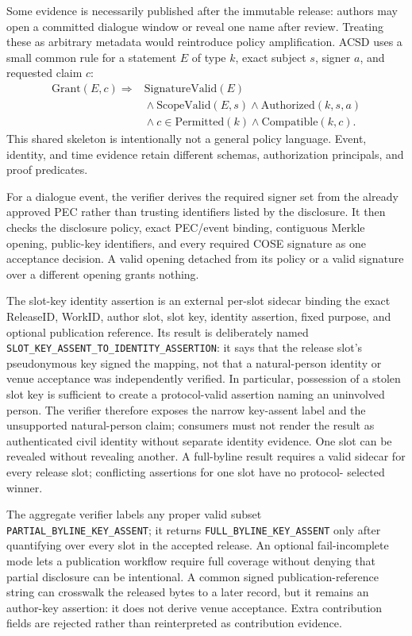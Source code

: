 \documentclass[conference,compsoc]{IEEEtran}
\newcommand{\releaseid}{\textsf{ReleaseID}}
\begin{document}
Some evidence is necessarily published after the immutable release: authors
may open a committed dialogue window or reveal one name after review. Treating
these as arbitrary metadata would reintroduce policy amplification. ACSD uses
a small common rule for a statement $E$ of type $k$, exact subject $s$, signer
$a$, and requested claim $c$:
\[
\begin{aligned}
 \mathrm{Grant}(E,c) \Rightarrow{}& \mathrm{SignatureValid}(E) \\
 &{}\land \mathrm{ScopeValid}(E,s)
 \land \mathrm{Authorized}(k,s,a) \\
 &{}\land c\in\mathrm{Permitted}(k)
 \land \mathrm{Compatible}(k,c).
\end{aligned}
\]
This shared skeleton is intentionally not a general policy language. Event,
identity, and time evidence retain different schemas, authorization principals,
and proof predicates.

For a dialogue event, the verifier derives the required signer set from the
already approved PEC rather than trusting identifiers listed by the disclosure.
It then checks the disclosure policy, exact PEC/event binding, contiguous
Merkle opening, public-key identifiers, and every required COSE signature as
one acceptance decision. A valid opening detached from its policy or a valid
signature over a different opening grants nothing.

The slot-key identity assertion is an external per-slot sidecar binding the exact
\releaseid, WorkID, author slot, slot key, identity assertion, fixed purpose,
and optional publication reference. Its result is deliberately named
\texttt{SLOT\_KEY\_ASSENT\_TO\_IDENTITY\_ASSERTION}: it says that the release
slot's pseudonymous key signed the mapping, not that a natural-person identity
or venue acceptance was independently verified. In particular, possession of
a stolen slot key is sufficient to create a protocol-valid assertion naming an
uninvolved person. The verifier therefore exposes the narrow key-assent label
and the unsupported natural-person claim; consumers must not render the result
as authenticated civil identity without separate identity evidence. One slot can be revealed
without revealing another. A full-byline result requires a valid sidecar for
every release slot; conflicting assertions for one slot have no protocol-
selected winner.

The aggregate verifier labels any proper valid subset
\texttt{PARTIAL\_BYLINE\_KEY\_ASSENT}; it returns
\texttt{FULL\_BYLINE\_KEY\_ASSENT} only after quantifying over every slot in
the accepted release. An optional fail-incomplete mode lets a publication
workflow require full coverage without denying that partial disclosure can be
intentional. A common signed publication-reference string can crosswalk the
released bytes to a later record, but it remains an author-key assertion: it
does not derive venue acceptance. Extra contribution fields are rejected
rather than reinterpreted as contribution evidence.
\end{document}
